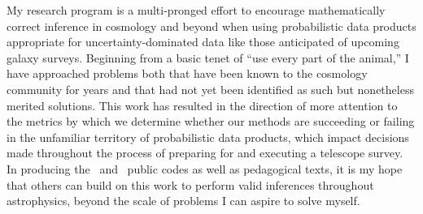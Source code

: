 My research program is a multi-pronged effort to encourage mathematically correct inference in cosmology and beyond when using probabilistic data products appropriate for uncertainty-dominated data like those anticipated of upcoming galaxy surveys.
Beginning from a basic tenet of ``use every part of the animal,'' I have approached problems both that have been known to the cosmology community for years and that had not yet been identified as such but nonetheless merited solutions.
This work has resulted in the direction of more attention to the metrics by which we determine whether our methods are succeeding or failing in the unfamiliar territory of probabilistic data products, which impact decisions made throughout the process of preparing for and executing a telescope survey.
In producing the \qp\ and \chippr\ public codes as well as pedagogical texts, it is my hope that others can build on this work to perform valid inferences throughout astrophysics, beyond the scale of problems I can aspire to solve myself.

